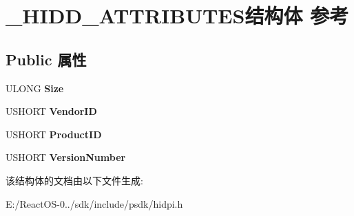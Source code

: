 \hypertarget{struct___h_i_d_d___a_t_t_r_i_b_u_t_e_s}{}\section{\+\_\+\+H\+I\+D\+D\+\_\+\+A\+T\+T\+R\+I\+B\+U\+T\+E\+S结构体 参考}
\label{struct___h_i_d_d___a_t_t_r_i_b_u_t_e_s}
\subsection*{Public 属性}
\begin{DoxyCompactItemize}
\item 
\mbox{\label{struct___h_i_d_d___a_t_t_r_i_b_u_t_e_s_a4331d0a28d31036209dd2f88d9f42c1b}} 
U\+L\+O\+NG {\bfseries Size}
\item 
\mbox{\label{struct___h_i_d_d___a_t_t_r_i_b_u_t_e_s_a49a87fede388453d31a2d245dba85baa}} 
U\+S\+H\+O\+RT {\bfseries Vendor\+ID}
\item 
\mbox{\label{struct___h_i_d_d___a_t_t_r_i_b_u_t_e_s_ade1b4f96c1cd7b3676f748a16db41aef}} 
U\+S\+H\+O\+RT {\bfseries Product\+ID}
\item 
\mbox{\label{struct___h_i_d_d___a_t_t_r_i_b_u_t_e_s_afba3b668c420377b11bfbaeaefca1c9d}} 
U\+S\+H\+O\+RT {\bfseries Version\+Number}
\end{DoxyCompactItemize}


该结构体的文档由以下文件生成\+:\begin{DoxyCompactItemize}
\item 
E\+:/\+React\+O\+S-\/0../sdk/include/psdk/hidpi.\+h\end{DoxyCompactItemize}
